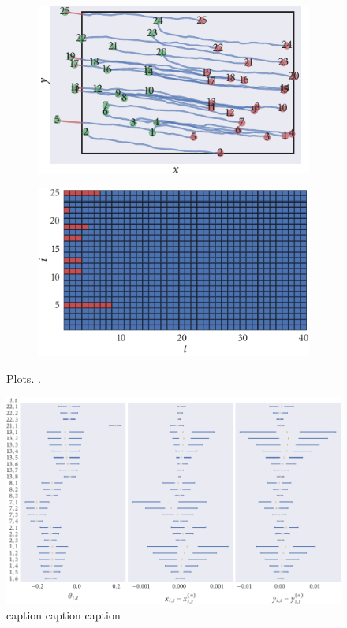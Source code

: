 \begin{figure}[tbp]
  \begin{subfigure}[b]{0.5\textwidth}
    \includegraphics{beg/data.pdf}
    \caption{}
    \label{subfig:beg_data}
  \end{subfigure}%
  \begin{subfigure}[b]{0.5\textwidth}
    \includegraphics{beg/missing_array.pdf}
    \caption{}
    \label{subfig:beg_missing}
  \end{subfigure}
  \caption{Plots. 
  .\lipsum[1]}
\end{figure}

\begin{figure}[tbp]
  \includegraphics{beg/summary.pdf}
  \caption{caption caption caption}
  \label{fig:beg_summary}
\end{figure}

